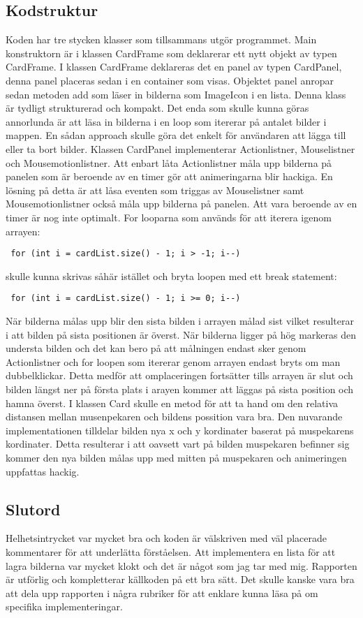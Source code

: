 \documentclass[hidelinks]{article}
\begin{document}
\subsection*{Kodstruktur}
Koden har tre stycken klasser som tillsammans utgör programmet. Main konstruktorn är i klassen CardFrame som deklarerar ett nytt objekt av typen CardFrame.
I klassen CardFrame deklareras det en panel av typen CardPanel, denna panel placeras sedan i en container som visas. Objektet panel anropar sedan metoden add som läser in bilderna som ImageIcon i en lista.
Denna klass är tydligt strukturerad och kompakt. Det enda som skulle kunna göras annorlunda är att läsa in bilderna i en loop som itererar på antalet bilder i mappen. En sådan approach skulle göra det enkelt för användaren att lägga till eller ta bort bilder.
Klassen CardPanel implementerar Actionlistner, Mouselistner och Mousemotionlistner. Att enbart låta Actionlistner måla upp bilderna på panelen som är beroende av en timer gör att animeringarna blir hackiga.
En lösning på detta är att låsa eventen som triggas av Mouselistner samt Mousemotionlistner också måla upp bilderna på panelen. Att vara beroende av en timer är nog inte optimalt.
For looparna som används för att iterera igenom arrayen: \begin{verbatim} for (int i = cardList.size() - 1; i > -1; i--)
\end{verbatim}
skulle kunna skrivas såhär istället och bryta loopen med ett break statement:
\begin{verbatim} for (int i = cardList.size() - 1; i >= 0; i--)
\end{verbatim}
När bilderna målas upp blir den sista bilden i arrayen målad sist vilket resulterar i att bilden på sista positionen är överst.
När bilderna ligger på hög markeras den understa bilden och det kan bero på att målningen endast sker genom Actionlistner och for loopen som itererar genom arrayen endast bryts om man dubbelklickar.
Detta medför att omplaceringen fortsätter tills arrayen är slut och bilden längst ner på första plats i arayen kommer att läggas på sista position och hamna överst.
I klassen Card skulle en metod för att ta hand om den relativa distansen mellan musenpekaren och bildens possition vara bra. Den nuvarande implementationen tilldelar bilden nya x och y kordinater baserat på muspekarens kordinater.
Detta resulterar i att oavsett vart på bilden muspekaren befinner sig kommer den nya bilden målas upp med mitten på muspekaren och animeringen uppfattas hackig.

\subsection*{Slutord}
Helhetsintrycket var mycket bra och koden är välskriven med väl placerade kommentarer för att underlätta förståelsen.
Att implementera en lista för att lagra bilderna var mycket klokt och det är något som jag tar med mig. Rapporten är utförlig och kompletterar källkoden på ett bra sätt.
Det skulle kanske vara bra att dela upp rapporten i några rubriker för att enklare kunna läsa på om specifika implementeringar.
\end{document}
